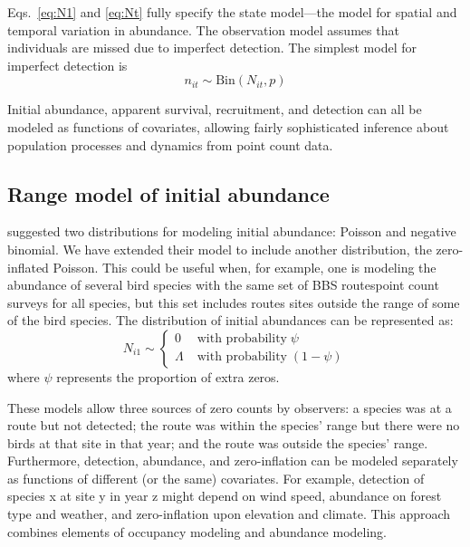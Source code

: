 \documentclass[12pt]{article}
\begin{document}
Eqs.~\ref{eq:N1} and \ref{eq:Nt} fully specify the state model---the
model for spatial and temporal variation in abundance. The observation
model assumes that individuals are missed due to imperfect
detection. The simplest model for imperfect detection is
\begin{equation}
  n_{it} \sim \mathrm{Bin}(N_{it}, p)
  \label{eq:p1}
\end{equation}

Initial abundance, apparent survival, recruitment, and detection can
all be modeled as functions of covariates, allowing fairly
sophisticated inference about population processes and dynamics from
point count data.

\subsection{Range model of initial abundance}

\citet{dail_madsen:2011} suggested two distributions for modeling
initial abundance: Poisson and negative binomial.  We have extended
their model to include another distribution, the zero-inflated
Poisson.  This could be useful when, for example, one is modeling the
abundance of several bird species with the same set of BBS routespoint
count surveys for all species, but this set includes routes sites
outside the range of some of the bird species.  The distribution of
initial abundances can be represented as:
\begin{equation}
N_{i1} \sim \left\{
\begin{aligned}
0 &\; \text{with probability} \; \psi \\
\Lambda &\; \text{with probability} \; (1-\psi)
\end{aligned} \right.
\label{eq:ZIP}
\end{equation}
where $\psi$ represents the proportion of extra zeros.

These models allow three sources of zero counts by observers: a
species was at a route but not detected; the route was within the
species' range but there were no birds at that site in that year; and
the route was outside the species' range.  Furthermore, detection,
abundance, and zero-inflation can be modeled separately as functions
of different (or the same) covariates.  For example, detection of
species x at site y in year z might depend on wind speed, abundance on
forest type and weather, and zero-inflation upon elevation and
climate.  This approach combines elements of occupancy modeling
\citep{mackenzie_etal:2006} and abundance modeling.
\end{document}
